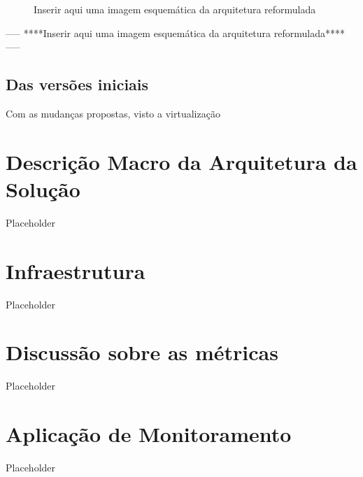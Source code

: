 {%

\begin{figure}[H]
\centering
\fbox{\rule{0pt}{150pt} \rule{200pt}{0pt}} %
\caption{Inserir aqui uma imagem esquemática da arquitetura reformulada}
\label{fig:placeholder}
\end{figure}

-----
****Inserir aqui uma imagem esquemática da arquitetura reformulada****
-----


\subsection{Das versões iniciais}
\label{subsection:VersõesIniciais}

Com as mudanças propostas, visto a virtualização


}
\section{Descrição Macro da Arquitetura da Solução}

Placeholder

\section{Infraestrutura}

Placeholder

\section{Discussão sobre as métricas}

Placeholder

\section{Aplicação de Monitoramento}

Placeholder
